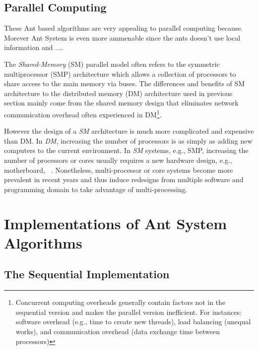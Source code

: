 \documentclass[11pt]{article}
\begin{document}

\subsection{Parallel Computing}
These Ant based algorithms are very appealing to parallel computing because.  Morever Ant System is even more ammenable since the ants doesn't use local information and ....


The \textit{Shared-Memory} (SM) parallel model often refers to the symmetric multiprocessor (SMP) architecture which allows a collection of processors to share access to the main memory via buses. The differences and benefits of SM architecture to the distributed memory (DM) architecture used in previous section mainly come from the shared memory design that eliminates network communication overhead often experienced in DM\footnote{Concurrent computing overheads generally contain factors not in the sequential version and makes the parallel version inefficient. For instances: software overhead (e.g., time to create new threads), load balancing (unequal works), and communication overhead (data exchange time between processors)}. 

However the design of a \textit{SM} architecture is much more complicated and expensive than DM. In \textit{DM}, increasing the number of processors is as simply as adding new computers to the current environment. In \textit{SM} systems, e.g., SMP, increasing the number of processors or cores usually requires a new hardware design, e.g., motherboard, ~\cite{Hi}.  Nonetheless, multi-processor or core systems become more prevalent in recent years and thus induce redesigns from multiple software and programming domain to take advantage of multi-processing.



\section{Implementations of Ant System Algorithms}\label{algorithm}

\subsection{The Sequential Implementation}\label{par_app} 
\end{document}
